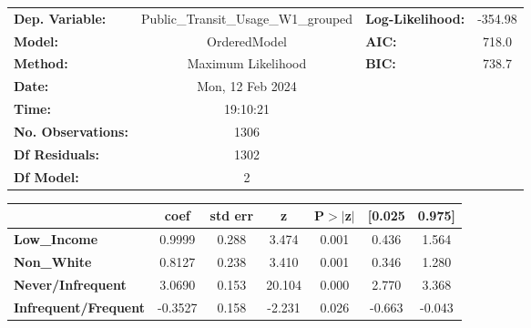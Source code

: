 \documentclass{report}
\begin{document}
\begin{center}
\begin{tabular}{lclc}
\toprule
\textbf{Dep. Variable:}      & Public\_Transit\_Usage\_W1\_grouped & \textbf{  Log-Likelihood:    } &   -354.98   \\
\textbf{Model:}              &             OrderedModel            & \textbf{  AIC:               } &     718.0   \\
\textbf{Method:}             &          Maximum Likelihood         & \textbf{  BIC:               } &     738.7   \\
\textbf{Date:}               &           Mon, 12 Feb 2024          & \textbf{                     } &             \\
\textbf{Time:}               &               19:10:21              & \textbf{                     } &             \\
\textbf{No. Observations:}   &                  1306               & \textbf{                     } &             \\
\textbf{Df Residuals:}       &                  1302               & \textbf{                     } &             \\
\textbf{Df Model:}           &                     2               & \textbf{                     } &             \\
\bottomrule
\end{tabular}
\begin{tabular}{lcccccc}
                             & \textbf{coef} & \textbf{std err} & \textbf{z} & \textbf{P$> |$z$|$} & \textbf{[0.025} & \textbf{0.975]}  \\
\midrule
\textbf{Low\_Income}         &       0.9999  &        0.288     &     3.474  &         0.001        &        0.436    &        1.564     \\
\textbf{Non\_White}          &       0.8127  &        0.238     &     3.410  &         0.001        &        0.346    &        1.280     \\
\textbf{Never/Infrequent}    &       3.0690  &        0.153     &    20.104  &         0.000        &        2.770    &        3.368     \\
\textbf{Infrequent/Frequent} &      -0.3527  &        0.158     &    -2.231  &         0.026        &       -0.663    &       -0.043     \\
\bottomrule
\end{tabular}
\end{center}
\end{document}
